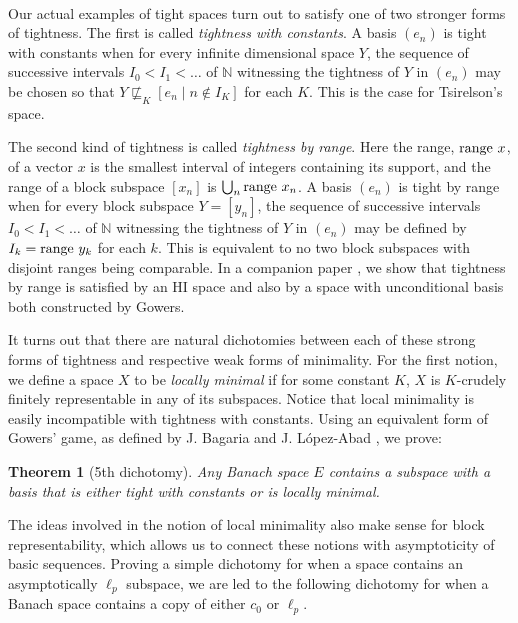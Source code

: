 \documentclass[10pt]{amsart}
\numberwithin{equation}{section}
\newtheorem{thm}{Theorem}[section]
\begin{document}
\

Our actual examples of tight spaces turn out to satisfy  one of two stronger
forms of tightness. The first is called {\em tightness with constants}. A basis
$(e_n)$ is tight with constants when for every infinite dimensional space $Y$,
the sequence of successive intervals $I_0<I_1<\ldots$ of ${\mathbb N}$ witnessing the
tightness of $Y$ in $(e_n)$ may be chosen so that $Y \not\sqsubseteq_K [e_n
{ \; \big| \;} n \notin I_K]$ for each $K$. This is the case for Tsirelson's space.

The second kind of tightness is called {\em tightness by range}. Here the
range, ${\rm range} \ x$, of  a vector $x$ is the smallest interval of integers
containing its support, and the range  of a block subspace $[x_n]$ is
$\bigcup_n {\rm range} \ x_n$. A  basis $(e_n)$ is tight by range when for
every block subspace $Y=[y_n]$, the sequence of successive intervals
$I_0<I_1<\ldots$ of ${\mathbb N}$ witnessing the tightness of $Y$ in $(e_n)$ may be
defined by $I_k={\rm range}\ y_k$ for each $k$. This is equivalent to no two
block subspaces with disjoint ranges being comparable. In a companion paper
\cite{exemples}, we show that tightness by range is satisfied by an HI space
and also by a space with unconditional basis both constructed by Gowers.

It turns out that there  are natural dichotomies between each of these strong
forms of tightness and respective weak forms of minimality. For the first
notion, we define a space $X$ to be {\em locally minimal} if for some constant
$K$, $X$ is $K$-crudely finitely representable in any of its subspaces. Notice
that local minimality is easily incompatible with tightness with constants.
Using an equivalent form of Gowers' game, as defined by J. Bagaria and J.
L\'opez-Abad \cite{BL}, we prove:

\begin{thm}[5th dichotomy] \label{main3}
Any Banach space $E$ contains a subspace with a basis that is either tight
with constants or is locally minimal.
\end{thm}

The ideas involved in the notion of local minimality also make sense for block
representability, which allows us to connect these notions with asymptoticity
of basic sequences. Proving a simple dichotomy for when a space contains an
asymptotically $\ell_p$ subspace, we are led to the following dichotomy for
when a Banach space contains a copy of either $c_0$ or $\ell_p$.
\end{document}
